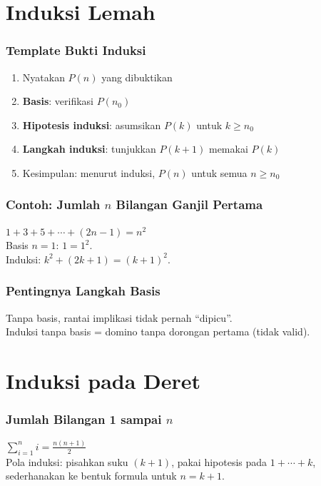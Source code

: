 \documentclass[handout]{beamer}
\theoremstyle{definition}
\theoremstyle{example}
\begin{document}
\section{Induksi Lemah}

\begin{frame}
\frametitle{Template Bukti Induksi}
\begin{enumerate}
  \item Nyatakan $P(n)$ yang dibuktikan
  \item \textbf{Basis}: verifikasi $P(n_0)$
  \item \textbf{Hipotesis induksi}: asumsikan $P(k)$ untuk $k \geq n_0$
  \item \textbf{Langkah induksi}: tunjukkan $P(k+1)$ memakai $P(k)$
  \item Kesimpulan: menurut induksi, $P(n)$ untuk semua $n \geq n_0$
\end{enumerate}
\end{frame}

\begin{frame}
\frametitle{Contoh: Jumlah $n$ Bilangan Ganjil Pertama}
$1 + 3 + 5 + \cdots + (2n-1) = n^2$\\
Basis $n=1$: $1 = 1^2$.\\
Induksi: $k^2 + (2k+1) = (k+1)^2$.
\end{frame}

\begin{frame}
\frametitle{Pentingnya Langkah Basis}
Tanpa basis, rantai implikasi tidak pernah ``dipicu''.\\
Induksi tanpa basis = domino tanpa dorongan pertama (tidak valid).
\end{frame}

\section{Induksi pada Deret}

\begin{frame}
\frametitle{Jumlah Bilangan 1 sampai $n$}
$\displaystyle\sum_{i=1}^{n} i = \frac{n(n+1)}{2}$\\
Pola induksi: pisahkan suku $(k+1)$, pakai hipotesis pada $1+\cdots+k$, sederhanakan ke bentuk formula untuk $n=k+1$.
\end{frame}
\end{document}
